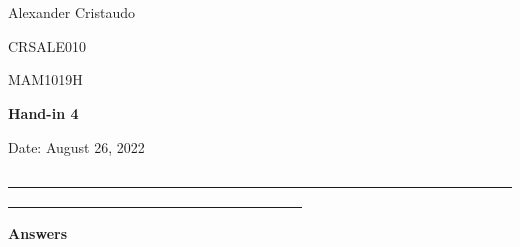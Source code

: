 \documentclass[12pt, a4paper]{exam}
\begin{document}
	\noindent
	\begin{minipage}[l]{0.1\textwidth}
		\noindent
	\end{minipage}
\hfill
\begin{minipage}[c]{1.0\textwidth} %
	\begin{center}
		
		{
		\large \ \ \par
		\large \ \ \par
		\large  Alexander Cristaudo \par
		\small	CRSALE010	\par
		\large	MAM1019H	\par
	\large \textbf{Hand-in 4}	\par
\small	Date: August 26, 2022}
	\end{center}
\end{minipage}
\par
\vspace{0.2in}
\noindent
\uline{ \ \ \ \ \ \ \ \ \ \ \ \ \ \ \ \ \ \ \ \ \ \ \ \ \ \ \ \ \ \ \ \ \ \ \ \ \ \ \ \ \ \ \ \ \ \ \ \ \ \ \ \ \ \ \ \ \ \ \ \ \ \ \ \ \ \ \ \ \ \ \ \ \ \ \ \ \ \  \ \ \ \ \ \ \ \ \ \ \ \ \ \  \ \ \ \ \ \ \ \ \ \ \ \ \ \ \ \ \ \ \ \ \ \ }
\par 
\vspace{0.15in}
\noindent
\centering
{\small \bfseries 	Answers}
\end{document}
